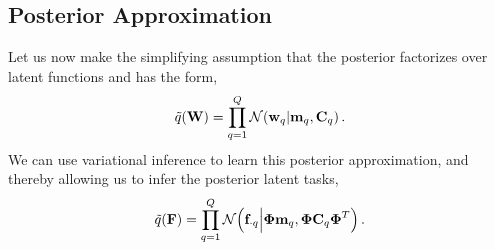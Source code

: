 \subsection{Posterior Approximation}
 Let us now make the simplifying assumption that the posterior factorizes over 
 latent functions and has the
form,
\begin{equation}
	\label{eq:posteriorW}
    \tilde{q}\!\left({\mathbf{W}}\right) = \prod^Q_{q=1} \mathcal{N}\!\left({\mathbf{w}_q}\middle\vert{\ensuremath{\mathbf{m}}_q, \ensuremath{\mathbf{C}}_q}\right).
\end{equation}
We can use variational inference to learn this posterior approximation, and
thereby allowing us to infer the posterior latent tasks,
\begin{equation}
\label{eq:posteriorF}
\tilde{q}\!\left({\mathbf{F}}\right)  = \prod^Q_{q=1} \mathcal{N}\!\left({\mathbf{f}_{\cdot q}}\middle\vert{\ensuremath{\boldsymbol\Phi}\ensuremath{\mathbf{m}}_q, \ensuremath{\boldsymbol\Phi}\ensuremath{\mathbf{C}}_q  \ensuremath{\boldsymbol\Phi}^T}\right) \text{.}
\end{equation}
%
%
